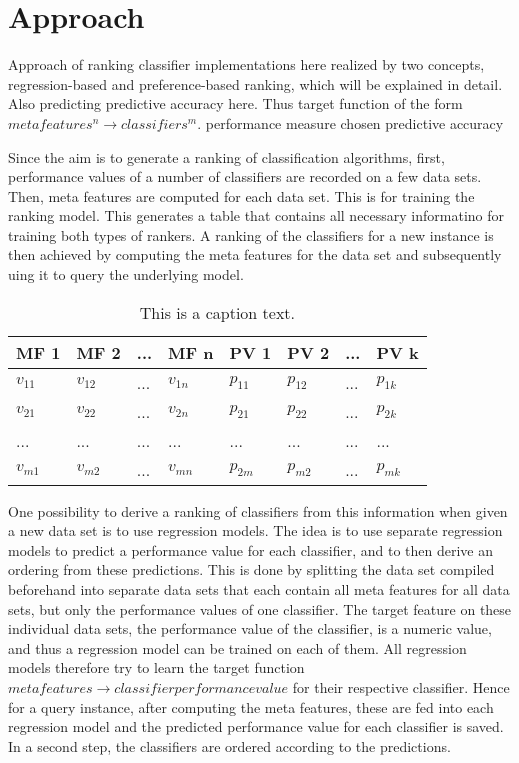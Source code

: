 %
\chapter{Approach}
\label{sec:approach}

Approach of ranking classifier implementations here realized by two concepts, regression-based and preference-based ranking, which will be explained in detail. Also predicting predictive accuracy here. Thus target function of the form $meta features^n \rightarrow classifiers^m$.
performance measure chosen predictive accuracy

Since the aim is to generate a ranking of classification algorithms, first, performance values of a number of classifiers are recorded on a few data sets. Then, meta features are computed for each data set. This is for training the ranking model. This generates a table that contains all necessary informatino for training both types of rankers. A ranking of the classifiers for a new instance is then achieved by computing the meta features for the data set and subsequently uing it to query the underlying model. 

\begin{table}[h]
\centering
	\begin{tabularx}{\textwidth}{X | X | X | X | X | X | X | X}
		MF 1			& MF 2		& ... 	& MF n		& PV 1 		& PV 2 		&	...	&	PV k 		\\ \hline
		$v_{11}$		& $v_{12}$	& ...	& $v_{1n}$	& $p_{11}$	& $p_{12}$	& 	...	&	$p_{1k}$		\\ \hline
		$v_{21}$		& $v_{22}$	& ...	& $v_{2n}$	& $p_{21}$	& $p_{22}$	& 	...	&	$p_{2k}$		\\ \hline
		...			& ...		& ...	& ...		& ...		& ...		&	...	&	...			\\ \hline
		$v_{m1}$		& $v_{m2}$	& ... 	& $v_{mn}$	& $p_{2m}$	& $p_{m2}$	& 	...	&	$p_{mk}$			 
	\end{tabularx}
	\label{tab:table1}
	\caption{This is a caption text.}
\end{table}

One possibility to derive a ranking of classifiers from this information when given a new data set is to use regression models. The idea is to use separate regression models to predict a performance value for each classifier, and to then derive an ordering from these predictions. This is done by splitting the data set compiled beforehand into separate data sets that each contain all meta features for all data sets, but only the performance values of one classifier. The target feature on these individual data sets, the performance value of the classifier, is a numeric value, and thus a regression model can be trained on each of them. All regression models therefore try to learn the target function $meta features \rightarrow classifier performance value$ for their respective classifier. Hence for a query instance, after computing the meta features, these are fed into each regression model and the predicted performance value for each classifier is saved. In a second step, the classifiers are ordered according to the predictions.


